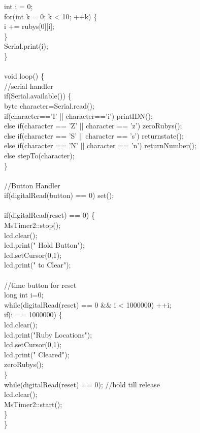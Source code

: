 {\tabto*{.5cm} int i = 0;\\
\tabto*{.5cm} for(int k = 0; k < 10; ++k) \{\\
\tabto*{1cm} i += rubys[0][i];\\
\tabto*{.5cm}\}\\
\tabto*{.5cm} Serial.print(i);\\
\}\\
\\
void loop() \{\\
\tabto*{.5cm} //serial handler\\
\tabto*{.5cm} if(Serial.available()) \{\\
\tabto*{1cm} byte character=Serial.read();\\
\tabto*{1cm} if(character=='I' || character=='i') printIDN();\\
\tabto*{1cm} else if(character == 'Z' || character == 'z') zeroRubys();\\
\tabto*{1cm} else if(character == 'S' || character == 's') returnstate();\\
\tabto*{1cm} else if(character == 'N' || character == 'n') returnNumber();\\
\tabto*{1cm}  else stepTo(character);\\
\tabto*{.5cm} \}\\
\\	
\tabto*{.5cm} //Button Handler\\
\tabto*{.5cm} if(digitalRead(button) == 0) set();\\
\\	
\tabto*{.5cm} if(digitalRead(reset) == 0) \{\\
\tabto*{1cm} MsTimer2::stop();\\
\tabto*{1cm} lcd.clear();\\
\tabto*{1cm} lcd.print("  Hold Button");\\
\tabto*{1cm} lcd.setCursor(0,1);\\
\tabto*{1cm} lcd.print("   to Clear");\\
\\
\tabto*{1cm} //time button for reset\\
\tabto*{1cm} long int i=0;\\
\tabto*{1cm} while(digitalRead(reset) == 0 \&\& i < 1000000) ++i; \\
\tabto*{1cm} if(i == 1000000) \{\\
\tabto*{1.5cm} lcd.clear();\\
\tabto*{1.5cm} lcd.print("Ruby Locations");\\
\tabto*{1.5cm} lcd.setCursor(0,1);\\
\tabto*{1.5cm} lcd.print("  Cleared");\\
\tabto*{1.5cm} zeroRubys();\\
\tabto*{1cm} \}\\
\tabto*{1cm} while(digitalRead(reset) == 0);\tabto*{7.5cm}   //hold till release\\
\tabto*{1cm} lcd.clear();\\
\tabto*{1cm} MsTimer2::start();\\
\tabto*{.5cm} \}\\
\}\\

}
